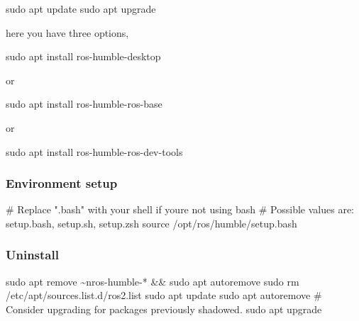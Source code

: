 \documentclass[
  letterpaper,
  DIV=11,
  numbers=noendperiod]{scrreprt}
\newenvironment{Shaded}{\begin{snugshade}}{\end{snugshade}}
\newcommand{\BuiltInTok}[1]{\textcolor[rgb]{0.00,0.23,0.31}{#1}}
\newcommand{\CommentTok}[1]{\textcolor[rgb]{0.37,0.37,0.37}{#1}}
\newcommand{\FunctionTok}[1]{\textcolor[rgb]{0.28,0.35,0.67}{#1}}
\newcommand{\KeywordTok}[1]{\textcolor[rgb]{0.00,0.23,0.31}{#1}}
\newcommand{\NormalTok}[1]{\textcolor[rgb]{0.00,0.23,0.31}{#1}}
\newcommand{\PreprocessorTok}[1]{\textcolor[rgb]{0.68,0.00,0.00}{#1}}
\begin{document}
\begin{Shaded}
\begin{Highlighting}[]
\FunctionTok{sudo}\NormalTok{ apt update}
\FunctionTok{sudo}\NormalTok{ apt upgrade}
\end{Highlighting}
\end{Shaded}

here you have three options,

\begin{Shaded}
\begin{Highlighting}[]
\FunctionTok{sudo}\NormalTok{ apt install ros{-}humble{-}desktop}
\end{Highlighting}
\end{Shaded}

or

\begin{Shaded}
\begin{Highlighting}[]
\FunctionTok{sudo}\NormalTok{ apt install ros{-}humble{-}ros{-}base}
\end{Highlighting}
\end{Shaded}

or

\begin{Shaded}
\begin{Highlighting}[]
\FunctionTok{sudo}\NormalTok{ apt install ros{-}humble{-}ros{-}dev{-}tools}
\end{Highlighting}
\end{Shaded}

\hypertarget{environment-setup}{%
\subsubsection{Environment setup}\label{environment-setup}}

\begin{Shaded}
\begin{Highlighting}[]
\CommentTok{\# Replace ".bash" with your shell if you\textquotesingle{}re not using bash}
\CommentTok{\# Possible values are: setup.bash, setup.sh, setup.zsh}
\BuiltInTok{source}\NormalTok{ /opt/ros/humble/setup.bash}
\end{Highlighting}
\end{Shaded}

\hypertarget{uninstall}{%
\subsubsection{Uninstall}\label{uninstall}}

\begin{Shaded}
\begin{Highlighting}[]
\FunctionTok{sudo}\NormalTok{ apt remove \textasciitilde{}nros{-}humble{-}}\PreprocessorTok{*} \KeywordTok{\&\&} \FunctionTok{sudo}\NormalTok{ apt autoremove}
\FunctionTok{sudo}\NormalTok{ rm /etc/apt/sources.list.d/ros2.list}
\FunctionTok{sudo}\NormalTok{ apt update}
\FunctionTok{sudo}\NormalTok{ apt autoremove}
\CommentTok{\# Consider upgrading for packages previously shadowed.}
\FunctionTok{sudo}\NormalTok{ apt upgrade}
\end{Highlighting}
\end{Shaded}
\end{document}
